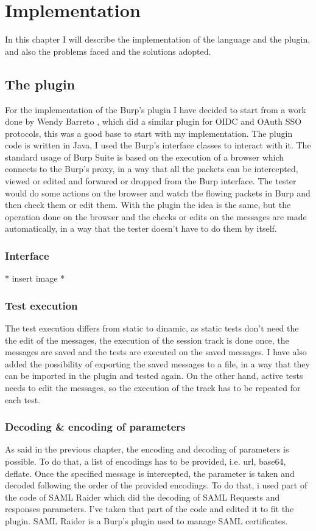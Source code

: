 \chapter{Implementation}
In this chapter I will describe the implementation of the language and the plugin, and also the problems faced and the solutions adopted.

\section{The plugin}
For the implementation of the Burp's plugin I have decided to start from a work done by Wendy Barreto \cite{wendy_barreto}, which did a similar plugin for OIDC and OAuth SSO protocols, this was a good base to start with my implementation. The plugin code is written in Java, I used the Burp's interface classes to interact with it.
The standard usage of Burp Suite is based on the execution of a browser which connects to the Burp's proxy, in a way that all the packets can be intercepted, viewed or edited and forwared or dropped from the Burp interface. The tester would do some actions on the browser and watch the flowing packets in Burp and then check them or edit them. With the plugin the idea is the same, but the operation done on the browser and the checks or edits on the messages are made automatically, in a way that the tester doesn't have to do them by itself.

\subsection{Interface}
* insert image *

\subsection{Test execution}
The test execution differs from static to dinamic, as static tests don't need the the edit of the messages, the execution of the session track is done once, the messages are saved and the tests are executed on the saved messages. I have also added the possibility of exporting the saved messages to a file, in a way that they can be imported in the plugin and tested again.
On the other hand, active tests needs to edit the messages, so the execution of the track has to be repeated for each test.

\subsection{Decoding \& encoding of parameters}
As said in the previous chapter, the encoding and decoding of parameters is possible. To do that, a list of encodings has to be provided, i.e. url, base64, deflate. Once the specified message is intercepted, the parameter is taken and decoded following the order of the provided encodings. To do that, i used part of the code of SAML Raider \cite{saml_raider} which did the decoding of SAML Requests and responses parameters. I've taken that part of the code and edited it to fit the plugin. SAML Raider is a Burp's plugin used to manage SAML certificates.

